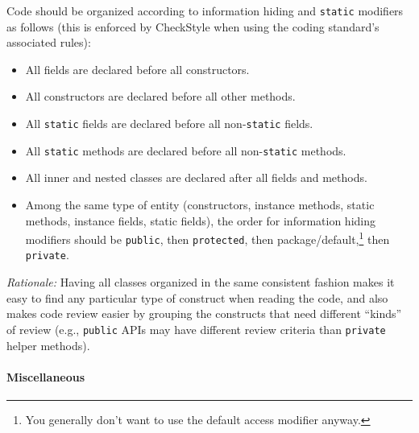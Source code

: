 Code should be organized according to information hiding and
\texttt{static} modifiers as follows (this is enforced by CheckStyle when using the coding standard's associated rules):
%
\begin{itemize}
\item All fields are declared before all constructors.
\item All constructors are declared before all other methods.
\item All \texttt{static} fields are declared before all
  non-\texttt{static} fields.
\item All \texttt{static} methods are declared before all
  non-\texttt{static} methods.
\item All inner and nested classes are declared after all fields and
  methods.
\item Among the same type of entity (constructors, instance methods,
  static methods, instance fields, static fields), the order for
  information hiding modifiers should be \texttt{public}, then
  \texttt{protected}, then package/default,\footnote{You generally
    don't want to use the default access modifier anyway.} then
  \texttt{private}.
\end{itemize}

\emph{Rationale:} Having all classes organized in the same consistent fashion makes it easy to find any particular type of construct when reading the code, and also makes code review easier by grouping the constructs that need different ``kinds'' of review (e.g., \texttt{public} APIs may have different review criteria than \texttt{private} helper methods).

\paragraph{Miscellaneous}

